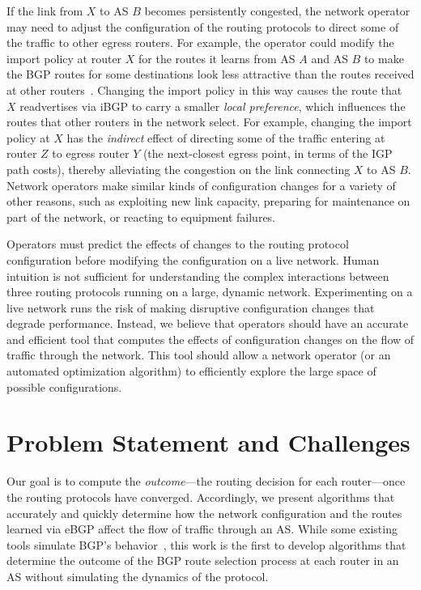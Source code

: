 If the link from $X$ to AS $B$ becomes persistently congested, the
network operator may need to adjust the configuration of the routing
protocols to direct some of the traffic to other egress routers.  For
example, the operator could modify the import policy at router $X$ for
the routes it learns from AS $A$ and AS $B$ to make the BGP routes for
some destinations look less attractive than the routes received at other
routers~\cite{Feamster2003e}.  Changing the import policy in this way
causes the route that $X$ readvertises via iBGP to carry a smaller {\em
local preference\/}, which influences the routes that other routers
in the network select.  For example, changing the import policy at $X$
has the {\em indirect\/} effect of directing some of the traffic
entering at router $Z$ to egress router $Y$ (the next-closest egress
point, in terms of the IGP path costs), thereby alleviating the
congestion on the link connecting $X$ to AS $B$.  Network operators make
similar kinds of configuration changes for a variety of other reasons, such
as exploiting new link capacity, preparing for maintenance on part of
the network, or reacting to equipment failures.

Operators must predict the effects of changes to the routing protocol
configuration before modifying the configuration on a live network.
Human intuition is not sufficient for understanding the complex
interactions between three routing protocols running on a large, dynamic
network.  Experimenting on a live network runs the risk of making
disruptive configuration changes that degrade performance.  Instead, we
believe that operators should have an accurate and efficient tool that
computes the effects of configuration changes on the flow of traffic
through the network.  This tool should allow a network operator (or an
automated optimization algorithm) to efficiently explore the large space
of possible configurations.

\section{Problem Statement and Challenges}\label{sec:sb_challenges}

Our goal is to compute the {\em outcome\/}---the routing decision for
each router---once the routing protocols have converged.  Accordingly,
we present algorithms that accurately and quickly determine how the
network configuration and the routes learned via eBGP affect the flow of
traffic through an AS.  While some existing tools simulate BGP's
behavior~\cite{www-ns-bgp,www-cbgp,www-ssfnet}, this work is the first
to develop algorithms that determine the outcome of the BGP route
selection process at each router in an AS without simulating the
dynamics of the protocol.

